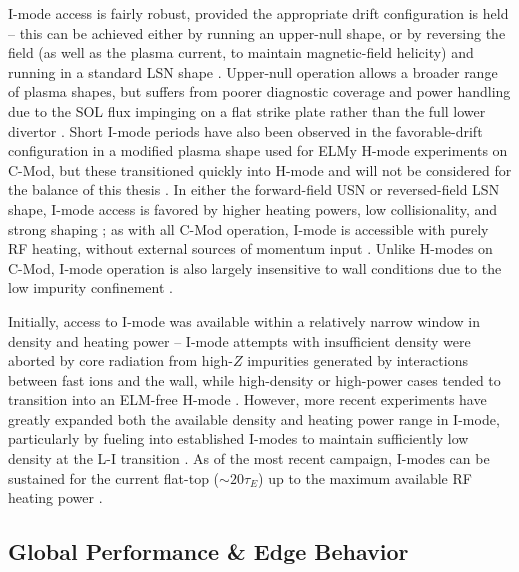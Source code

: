I-mode access is fairly robust, provided the appropriate drift configuration is held -- this can be achieved either by running an upper-null shape, or by reversing the field (as well as the plasma current, to maintain magnetic-field helicity) and running in a standard LSN shape \cite{Hubbard2012}.  Upper-null operation allows a broader range of plasma shapes, but suffers from poorer diagnostic coverage and power handling due to the SOL flux impinging on a flat strike plate rather than the full lower divertor \cite{Hubbard2012,Dominguez2012}.  Short I-mode periods have also been observed in the favorable-drift configuration in a modified plasma shape used for ELMy H-mode experiments on C-Mod, but these transitioned quickly into H-mode and will not be considered for the balance of this thesis \cite{Dominguez2012,Hughes2013}.  In either the forward-field USN or reversed-field LSN shape, I-mode access is favored by higher heating powers, low collisionality, and strong shaping \cite{Whyte2010}; as with all C-Mod operation, I-mode is accessible with purely RF heating, without external sources of momentum input \cite{Hubbard2012b}.  Unlike H-modes on C-Mod, I-mode operation is also largely insensitive to wall conditions due to the low impurity confinement \cite{Hubbard2012}.

Initially, access to I-mode was available within a relatively narrow window in density and heating power -- I-mode attempts with insufficient density were aborted by core radiation from high-$Z$ impurities generated by interactions between fast ions and the wall, while high-density or high-power cases tended to transition into an ELM-free H-mode \cite{Whyte2010}.  However, more recent experiments have greatly expanded both the available density and heating power range in I-mode, particularly by fueling into established I-modes to maintain sufficiently low density at the L-I transition \cite{Hubbard2012b}.  As of the most recent campaign, I-modes can be sustained for the current flat-top ($\sim 20\tau_E$) up to the maximum available RF heating power \cite{Hubbard2012,Hubbard2012b}.

\subsection{Global Performance \& Edge Behavior}\label{subsec:hcr_imode_performance}

